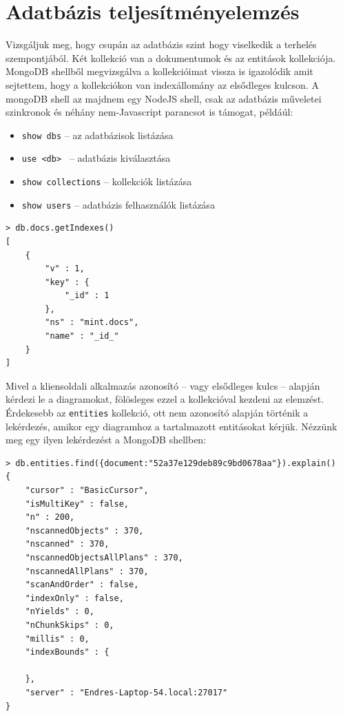 \section{Adatbázis teljesítményelemzés}

Vizsgáljuk meg, hogy csupán az adatbázis szint hogy viselkedik a terhelés szempontjából. Két kollekció van a dokumentumok és az entitások kollekciója. MongoDB shellből megvizsgálva a kollekcióimat vissza is igazolódik amit sejtettem, hogy a kollekciókon van indexállomány az elsődleges kulcson. A mongoDB shell az majdnem egy NodeJS shell, csak az adatbázis műveletei szinkronok és néhány nem-Javascript parancsot is támogat, példáúl:

\begin{itemize}
\item \lstinline{show dbs} -- az adatbázisok listázása
\item \lstinline{use <db> } -- adatbázis kiválasztása  
\item \lstinline{show collections} -- kollekciók listázása
\item \lstinline{show users} -- adatbázis felhasználók listázása
\end{itemize}

\begin{lstlisting}[caption=A diagram kollekció indexei]
> db.docs.getIndexes()
[
    {
        "v" : 1,
        "key" : {
            "_id" : 1
        },
        "ns" : "mint.docs",
        "name" : "_id_"
    }
]
\end{lstlisting}

Mivel a kliensoldali alkalmazás azonosító -- vagy elsődleges kulcs -- alapján kérdezi le a diagramokat, fölösleges ezzel a kollekcióval kezdeni az elemzést. Érdekesebb az \lstinline{entities} kollekció, ott nem azonosító alapján történik a lekérdezés, amikor egy diagramhoz a tartalmazott entitásokat kérjük.
Nézzünk meg egy ilyen lekérdezést a MongoDB shellben:

\begin{lstlisting}[caption=Az diagram kollekció egy lekérdezésének a query terve]
> db.entities.find({document:"52a37e129deb89c9bd0678aa"}).explain()
{
    "cursor" : "BasicCursor",
    "isMultiKey" : false,
    "n" : 200,
    "nscannedObjects" : 370,
    "nscanned" : 370,
    "nscannedObjectsAllPlans" : 370,
    "nscannedAllPlans" : 370,
    "scanAndOrder" : false,
    "indexOnly" : false,
    "nYields" : 0,
    "nChunkSkips" : 0,
    "millis" : 0,
    "indexBounds" : {

    },
    "server" : "Endres-Laptop-54.local:27017"
}
\end{lstlisting}


